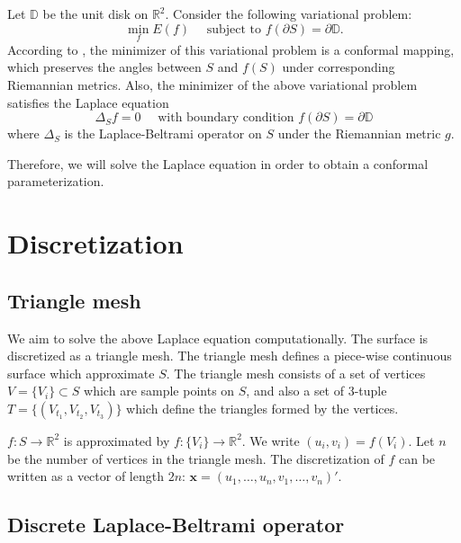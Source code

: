 \documentclass{article} %
\begin{document}
Let $\mathbb{D}$ be the unit disk on $\mathbb{R}^2$. Consider the following variational problem:
$$
	\min_f E(f) \quad \text{ subject to } f(\partial S) = \partial \mathbb{D}.
$$
According to \cite{hutchinson1991computing}, the minimizer of this variational problem is a conformal mapping, which preserves the angles between $S$ and $f(S)$ under corresponding Riemannian metrics. Also, the minimizer of the above variational problem satisfies the Laplace equation
$$
\Delta_S f = 0 \quad \text{ with boundary condition } f(\partial S) = \partial \mathbb{D}
$$
where $\Delta_S$ is the Laplace-Beltrami operator on $S$ under the Riemannian metric $g$.

Therefore, we will solve the Laplace equation in order to obtain a conformal parameterization.

\section{Discretization}

\subsection{Triangle mesh}
We aim to solve the above Laplace equation computationally. The surface is discretized as a triangle mesh.  The triangle mesh defines a piece-wise continuous surface which approximate $S$. The triangle mesh consists of a set of vertices $V = \{ V_i \} \subset S$ which are sample points on $S$, and also a set of 3-tuple $T = \{ (V_{t_1}, V_{t_2}, V_{t_3}) \}$ which define the triangles formed by the vertices.

$f: S \rightarrow \mathbb{R}^2$ is approximated by $f: \{ V_i \} \rightarrow \mathbb{R}^2$. We write $(u_i, v_i) = f(V_i)$. Let $n$ be the number of vertices in the triangle mesh. The discretization of $f$ can be written as a vector of length $2n$: $\mathbf{x} = (u_1, \dots, u_n , v_1, \dots, v_n)'$. 

\subsection{Discrete Laplace-Beltrami operator}
\end{document}
